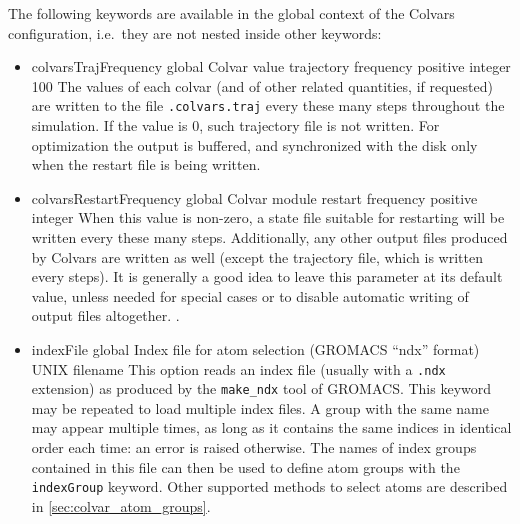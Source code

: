 The following keywords are available in the global context of the Colvars configuration, i.e.~they are not nested inside other keywords:
\begin{itemize}

\item %
  \keydef
    {colvarsTrajFrequency}{%
    global}{%
  Colvar value trajectory frequency}{%
    positive integer}{%
    100}{%
    The values of each colvar (and of other related quantities, if requested) are written to the file \outputName\texttt{.colvars.traj} every these many steps throughout the simulation.
    If the value is 0, such trajectory file is not written.
    For optimization the output is buffered, and synchronized with the disk only when the restart file is being written.}

\item %
  \keydef
    {colvarsRestartFrequency}{%
    global}{%
    Colvar module restart frequency}{%
    positive integer}{%
    }{%
    When this value is non-zero, a state file suitable for restarting will be written every these many steps.
    Additionally, any other output files produced by Colvars are written as well (except the trajectory file, which is written every  steps).
    It is generally a good idea to leave this parameter at its default value, unless needed for special cases or to disable automatic writing of output files altogether.
    \ifdefined{}.\fi}

\item %
  \key
    {indexFile}{%
    global}{%
    Index file for atom selection (GROMACS ``ndx'' format)}{%
    UNIX filename}{%
    This option reads an index file (usually with a \texttt{.ndx}
    extension) as produced by the \texttt{make\_ndx} tool of GROMACS.
    This keyword may be repeated to load multiple index files.
    A group with the same name may appear multiple times, as long as it contains the same indices in identical order each time: an error is raised otherwise.
    The names of index groups contained in this file can then be used to define
    atom groups with the \texttt{indexGroup} keyword.
    Other supported methods to select atoms are described in \ref{sec:colvar_atom_groups}.
  }


\end{itemize}
